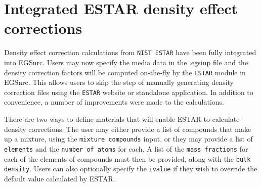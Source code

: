 
%
%
%
%
%
%
%
%
%




\section{Integrated ESTAR density effect corrections}
\label{estar}

Density effect correction calculations from {\tt NIST ESTAR} have been fully integrated into EGSnrc. Users may now specify the media data in the .egsinp file and the density correction factors will be computed on-the-fly by the {\tt ESTAR} module in EGSnrc. This allows users to skip the step of manually generating density correction files using the {\tt ESTAR} website or standalone application. In addition to convenience, a number of improvements were made to the calculations.

There are two ways to define materials that will enable ESTAR to calculate density corrections. The user may either provide a list of compounds that make up a mixture, using the {\tt mixture compounds} input, or they may provide a list of {\tt elements} and the {\tt number of atoms} for each. A list of the {\tt mass fractions} for each of the elements of compounds must then be provided, along with the {\tt bulk density}. Users can also optionally specify the {\tt ivalue} if they wish to override the default value calculated by ESTAR.

